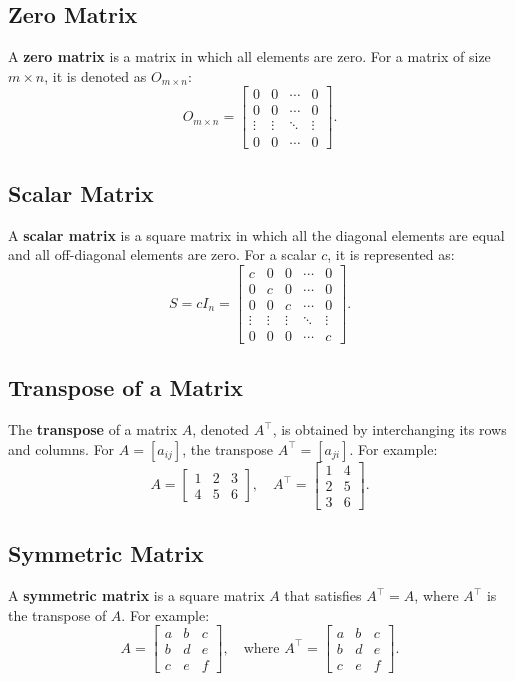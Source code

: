 \documentclass{article}
\begin{document}
\subsection{Zero Matrix}
A \textbf{zero matrix} is a matrix in which all elements are zero. For a matrix of size $m \times n$, it is denoted as $O_{m \times n}$:
\[
O_{m \times n} =
\begin{bmatrix}
0 & 0 & \cdots & 0 \\
0 & 0 & \cdots & 0 \\
\vdots & \vdots & \ddots & \vdots \\
0 & 0 & \cdots & 0
\end{bmatrix}.
\]

\subsection{Scalar Matrix}
A \textbf{scalar matrix} is a square matrix in which all the diagonal elements are equal and all off-diagonal elements are zero. For a scalar $c$, it is represented as:
\[
S = c I_n = 
\begin{bmatrix}
c & 0 & 0 & \cdots & 0 \\
0 & c & 0 & \cdots & 0 \\
0 & 0 & c & \cdots & 0 \\
\vdots & \vdots & \vdots & \ddots & \vdots \\
0 & 0 & 0 & \cdots & c
\end{bmatrix}.
\]

\subsection{Transpose of a Matrix}
The \textbf{transpose} of a matrix $A$, denoted $A^\top$, is obtained by interchanging its rows and columns. For $A = [a_{ij}]$, the transpose $A^\top = [a_{ji}]$. For example:
\[
A =
\begin{bmatrix}
1 & 2 & 3 \\
4 & 5 & 6
\end{bmatrix}, \quad
A^\top =
\begin{bmatrix}
1 & 4 \\
2 & 5 \\
3 & 6
\end{bmatrix}.
\]

\subsection{Symmetric Matrix}
A \textbf{symmetric matrix} is a square matrix $A$ that satisfies $A^\top = A$, where $A^\top$ is the transpose of $A$. For example:
\[
A =
\begin{bmatrix}
a & b & c \\
b & d & e \\
c & e & f
\end{bmatrix}, \quad \text{where } A^\top = 
\begin{bmatrix}
a & b & c \\
b & d & e \\
c & e & f
\end{bmatrix}.
\]
\end{document}
